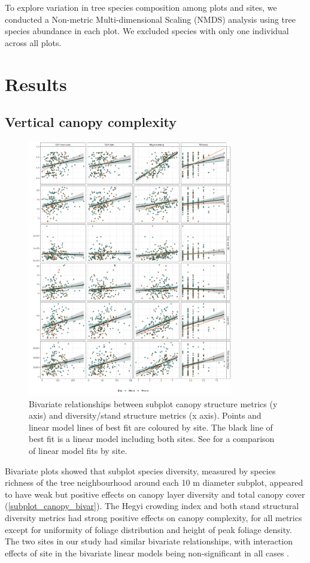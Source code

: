 \documentclass[11pt,a4paper]{article}
\begin{document}
To explore variation in tree species composition among plots and sites, we conducted a Non-metric Multi-dimensional Scaling (NMDS) analysis using tree species abundance in each plot. We excluded species with only one individual across all plots.  

\section{Results}

\subsection{Vertical canopy complexity}

\begin{figure}[H]
\centering
	\includegraphics[width=0.8\textwidth]{subplot_canopy_bivar}
	\caption{Bivariate relationships between subplot canopy structure metrics (y axis) and diversity/stand structure metrics (x axis). Points and linear model lines of best fit are coloured by site. The black line of best fit is a linear model including both sites. See  for a comparison of linear model fits by site.}
	\label{subplot_canopy_bivar}
\end{figure}


Bivariate plots showed that subplot species diversity, measured by species richness of the tree neighbourhood around each 10 m diameter subplot, appeared to have weak but positive effects on canopy layer diversity and total canopy cover (\autoref{subplot_canopy_bivar}). The Hegyi crowding index and both stand structural diversity metrics had strong positive effects on canopy complexity, for all metrics except for uniformity of foliage distribution and height of peak foliage density. The two sites in our study had similar bivariate relationships, with interaction effects of site in the bivariate linear models being non-significant in all cases .
\end{document}
